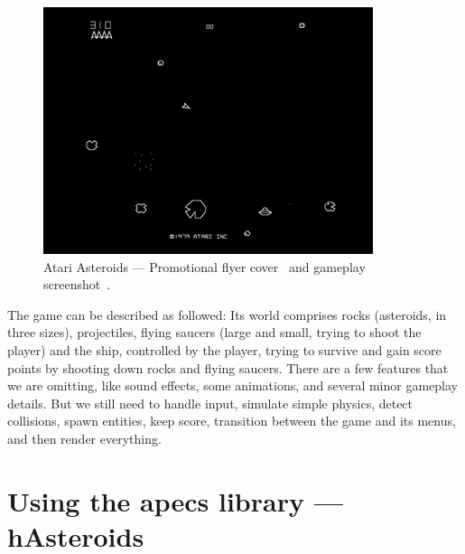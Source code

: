 \documentclass[
  digital, %
  color,   %
  table,   %
  oneside, %
  lof,     %
  lot,     %
]{fithesis3}
\begin{document}
\begin{figure}
\begin{minipage}{0.33\textwidth}
    \end{minipage}
    \hfill
    \begin{minipage}{0.66\textwidth}
        \hfill \includegraphics[height=0.65\textwidth]{images/atariasteroids-screenshot.png}
    \end{minipage}
    \caption{Atari Asteroids --- Promotional flyer cover~\cite{asteroidsflyer}
    and gameplay screenshot~\cite{asteroidsscreenshot}.}
\end{figure}

The game can be described as followed:
 \cite{aboutasteroids}
Its world comprises rocks (asteroids, in three sizes), projectiles,
flying saucers (large and small, trying to shoot the player) and the ship, controlled by the player,
trying to survive and gain score points by shooting down rocks and flying saucers.
There are a few features that we are omitting, like sound effects, some animations,
and several minor gameplay details. But we still need to handle input, simulate simple physics,
detect collisions, spawn entities, keep score, transition between the game
and its menus, and then render everything.



\chapter{Using the apecs library --- hAsteroids}
\label{chptr:hasteroids}
\end{document}
